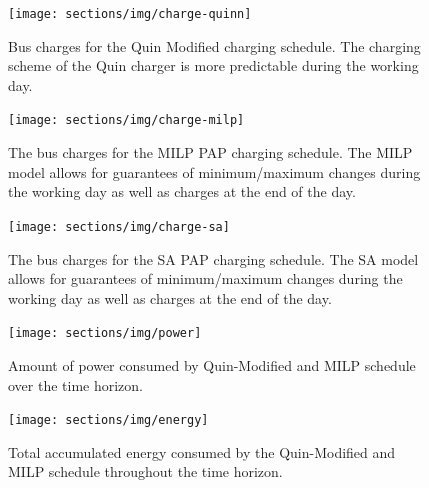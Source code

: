 \documentclass[11pt,a4paper,final]{article}
\begin{document}
\begin{subfigures}
    \begin{figure}[htpb]
    \centering
        \texttt{[image: sections/img/charge-quinn]}
        \caption{Bus charges for the Quin Modified charging schedule. The charging scheme of the Quin charger is more predictable during the working day.}
        \label{subfig:quin-charge}
    \end{figure}

    \hfill

    \begin{figure}[htpb]
    \centering
        \texttt{[image: sections/img/charge-milp]}
        \caption{The bus charges for the MILP PAP charging schedule. The MILP model allows for guarantees of minimum/maximum changes during the working day as well as charges at the end of the day.}
        \label{subfig:milp-charge}
    \end{figure}

    \begin{figure}[htpb]
    \centering
        \texttt{[image: sections/img/charge-sa]}
        \caption{The bus charges for the SA PAP charging schedule. The SA model allows for guarantees of minimum/maximum changes during the working day as well as charges at the end of the day.}
        \label{subfig:sa-charge}
    \end{figure}
\end{subfigures}

\begin{figure}[htpb]
\centering
    \texttt{[image: sections/img/power]}
    \caption{Amount of power consumed by Quin-Modified and MILP schedule over the time horizon.}
    \label{fig:power-usage}
\end{figure}

\begin{figure}[htpb]
\centering \texttt{[image: sections/img/energy]}
    \caption{Total accumulated energy consumed by the Quin-Modified and MILP schedule throughout the time horizon.}
    \label{fig:energy-usage}
\end{figure}




\end{document}
